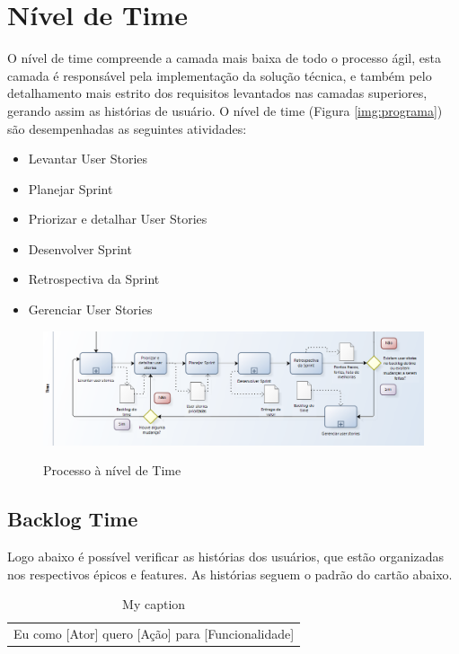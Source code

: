 \section{Nível de Time}

O nível de time compreende a camada mais baixa de todo o processo ágil, esta camada é responsável pela implementação da solução técnica, e também pelo detalhamento mais estrito dos requisitos levantados nas camadas superiores, gerando assim as histórias de usuário. O nível de time (Figura \ref{img:programa}) são desempenhadas as seguintes atividades:

\begin{itemize}
\item Levantar User Stories
\item Planejar Sprint
\item Priorizar e detalhar User Stories
\item Desenvolver Sprint
\item Retrospectiva da Sprint
\item Gerenciar User Stories
\end{itemize}

\FloatBarrier
\begin{figure}[!htpd]
		\centering
		\includegraphics[scale=0.4]{figuras/time}
		\label{img:time}
		\caption{Processo à nível de Time}
\end{figure}

\subsection{Backlog Time}

Logo abaixo é possível verificar as histórias dos usuários, que estão organizadas nos respectivos épicos e features. As histórias seguem o padrão do cartão abaixo.

\FloatBarrier
\begin{table}[!htpd]
\centering
\caption{My caption}
\label{my-label}
\begin{tabular}{l}
Eu como {[}Ator{]} quero {[}Ação{]} para {[}Funcionalidade{]}
\end{tabular}
\end{table}

